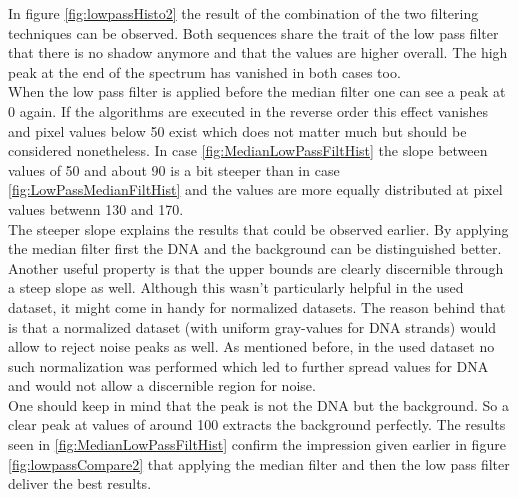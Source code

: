 \documentclass{article}
\begin{document}
In figure \ref{fig:lowpassHisto2} the result of the combination of the two filtering techniques can be observed. Both sequences share the trait of the low pass filter that there is no shadow anymore and that the values are higher overall. The high peak at the end of the spectrum has vanished in both cases too. \\
When the low pass filter is applied before the median filter one can see a peak at 0 again. If the algorithms are executed in the reverse order this effect vanishes and pixel values below 50 exist which does not matter much but should be considered nonetheless. In case \ref{fig:MedianLowPassFiltHist} the slope between values of 50 and about 90 is a bit steeper than in case \ref{fig:LowPassMedianFiltHist} and the values are more equally distributed at pixel values betwenn 130 and 170. \\
The steeper slope explains the results that could be observed earlier. By applying the median filter first the DNA and the background can be distinguished better. Another useful property is that the upper bounds are clearly discernible through a steep slope as well. Although this wasn't particularly helpful in the used dataset, it might come in handy for normalized datasets. The reason behind that is that a normalized dataset (with uniform gray-values for DNA strands) would allow to reject noise peaks as well. As mentioned before, in the used dataset no such normalization was performed which led to further spread values for DNA and would not allow a discernible region for noise.
\\ One should keep in mind that the peak is not the DNA but the background. So a clear peak at values of around 100 extracts the background perfectly. The results seen in \ref{fig:MedianLowPassFiltHist} confirm the impression given earlier in figure \ref{fig:lowpassCompare2} that applying the median filter and then the low pass filter deliver the best results.
\end{document}
